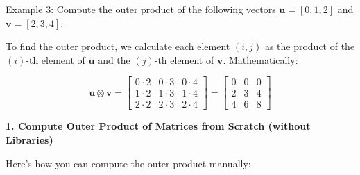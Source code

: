 \documentclass[
  letterpaper,
  DIV=11,
  numbers=noendperiod]{scrreprt}
\theoremstyle{plain}
\theoremstyle{definition}
\theoremstyle{remark}
\begin{document}
Example 3: Compute the outer product of the following vectors
\(\mathbf{u} = [0, 1, 2]\) and \(\mathbf{v} = [2, 3, 4]\).

To find the outer product, we calculate each element \((i, j)\) as the
product of the \((i)\)-th element of \(\mathbf{u}\) and the \((j)\)-th
element of \(\mathbf{v}\). Mathematically:

\[\mathbf{u} \otimes \mathbf{v} = \begin{bmatrix}
0 \cdot 2 & 0 \cdot 3 & 0 \cdot 4 \\
1 \cdot 2 & 1 \cdot 3 & 1 \cdot 4 \\
2 \cdot 2 & 2 \cdot 3 & 2 \cdot 4
\end{bmatrix}
= \begin{bmatrix}
0 & 0 & 0 \\
2 & 3 & 4 \\
4 & 6 & 8
\end{bmatrix}\]

\textbf{1. Compute Outer Product of Matrices from Scratch (without
Libraries)}

Here's how you can compute the outer product manually:
\end{document}
